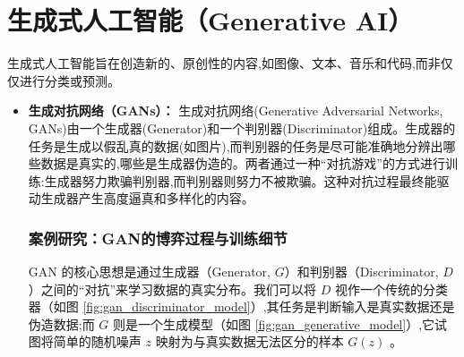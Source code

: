 \section{生成式人工智能（Generative AI）}
\label{sec:generative_ai}
生成式人工智能旨在创造新的、原创性的内容,如图像、文本、音乐和代码,而非仅仅进行分类或预测。
\begin{itemize}
    \item \textbf{生成对抗网络（GANs）：} 生成对抗网络(Generative Adversarial Networks, GANs)由一个生成器(Generator)和一个判别器(Discriminator)组成。生成器的任务是生成以假乱真的数据(如图片),而判别器的任务是尽可能准确地分辨出哪些数据是真实的,哪些是生成器伪造的。两者通过一种“对抗游戏”的方式进行训练:生成器努力欺骗判别器,而判别器则努力不被欺骗。这种对抗过程最终能驱动生成器产生高度逼真和多样化的内容。
    
    \subsubsection*{案例研究：GAN的博弈过程与训练细节}
    \label{sssec:gan_case_study}
    GAN 的核心思想是通过生成器（Generator, $G$）和判别器（Discriminator, $D$）之间的“对抗”来学习数据的真实分布。我们可以将 $D$ 视作一个传统的分类器（如图 \ref{fig:gan_discriminator_model}）,其任务是判断输入是真实数据还是伪造数据;而 $G$ 则是一个生成模型（如图 \ref{fig:gan_generative_model}）,它试图将简单的随机噪声 $z$ 映射为与真实数据无法区分的样本 $G(z)$ 。


\end{itemize}
